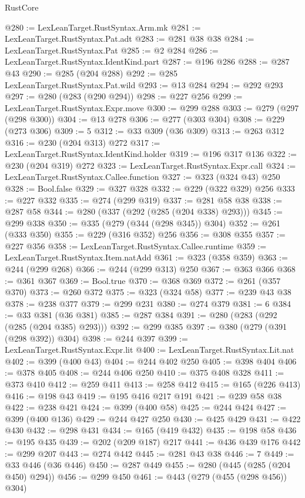 \begin{lexlean}{RustCore}
\begin{coremodule}
@280 := LexLeanTarget.RustSyntax.Arm.mk
@281 := LexLeanTarget.RustSyntax.Pat.adt
@283 := @281 @38 @38
@284 := LexLeanTarget.RustSyntax.Pat
@285 := @2 @284
@286 := LexLeanTarget.RustSyntax.IdentKind.part
@287 := @196 @286
@288 := @287 @43
@290 := @285 (@204 @288)
@292 := @285 LexLeanTarget.RustSyntax.Pat.wild
@293 := @13 @284
@294 := @292 @293
@297 := @280 (@283 (@290 @294))
@298 := @227 @256
@299 := LexLeanTarget.RustSyntax.Expr.move
@300 := @299 @288
@303 := @279 (@297 (@298 @300))
@304 := @13 @278
@306 := @277 (@303 @304)
@308 := @229 (@273 @306)
@309 := 5
@312 := @33 @309 (@36 @309)
@313 := @263 @312
@316 := @230 (@204 @313) @272
@317 := LexLeanTarget.RustSyntax.IdentKind.holder
@319 := @196 @317 @136
@322 := @230 (@204 @319) @272
@323 := LexLeanTarget.RustSyntax.Expr.call
@324 := LexLeanTarget.RustSyntax.Callee.function
@327 := @323 (@324 @43) @250
@328 := Bool.false
@329 := @327 @328
@332 := @229 (@322 @329) @256
@333 := @227 @332
@335 := @274 (@299 @319)
@337 := @281 @58 @38
@338 := @287 @58
@344 := @280 (@337 (@292 (@285 (@204 @338) @293)))
@345 := @299 @338
@350 := @335 (@279 (@344 (@298 @345)) @304)
@352 := @261 (@333 @350)
@355 := @229 (@316 @352) @256
@356 := @308 @355
@357 := @227 @356
@358 := LexLeanTarget.RustSyntax.Callee.runtime
@359 := LexLeanTarget.RustSyntax.Item.natAdd
@361 := @323 (@358 @359)
@363 := @244 (@299 @268)
@366 := @244 (@299 @313) @250
@367 := @363 @366
@368 := @361 @367
@369 := Bool.true
@370 := @368 @369
@372 := @261 (@357 @370)
@373 := @260 @372
@375 := @323 (@324 @58)
@377 := @239 @43 @38
@378 := @238 @377
@379 := @299 @231
@380 := @274 @379
@381 := 6
@384 := @33 @381 (@36 @381)
@385 := @287 @384
@391 := @280 (@283 (@292 (@285 (@204 @385) @293)))
@392 := @299 @385
@397 := @380 (@279 (@391 (@298 @392)) @304)
@398 := @244 @397
@399 := LexLeanTarget.RustSyntax.Expr.lit
@400 := LexLeanTarget.RustSyntax.Lit.nat
@402 := @399 (@400 @43)
@404 := @244 @402 @250
@405 := @398 @404
@406 := @378 @405
@408 := @244 @406 @250
@410 := @375 @408 @328
@411 := @373 @410
@412 := @259 @411
@413 := @258 @412
@415 := @165 (@226 @413)
@416 := @198 @43
@419 := @195 @416 @217 @191
@421 := @239 @58 @38
@422 := @238 @421
@424 := @399 (@400 @58)
@425 := @244 @424
@427 := @399 (@400 @136)
@429 := @244 @427 @250
@430 := @425 @429
@431 := @422 @430
@432 := @298 @431
@434 := @165 (@419 @432)
@435 := @198 @58
@436 := @195 @435
@439 := @202 (@209 @187) @217
@441 := @436 @439 @176
@442 := @299 @207
@443 := @274 @442
@445 := @281 @43 @38
@446 := 7
@449 := @33 @446 (@36 @446)
@450 := @287 @449
@455 := @280 (@445 (@285 (@204 @450) @294))
@456 := @299 @450
@461 := @443 (@279 (@455 (@298 @456)) @304)

\end{coremodule}
\end{lexlean}
